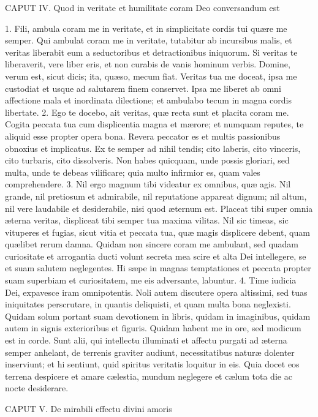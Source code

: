 CAPUT IV.
Quod in veritate et humilitate coram Deo conversandum est

1. Fili, ambula coram me in veritate, et in simplicitate cordis tui quære me semper. Qui ambulat coram me in veritate, tutabitur ab incursibus malis, et veritas liberabit eum a seductoribus et detractionibus iniquorum. Si veritas te liberaverit, vere liber eris, et non curabis de vanis hominum verbis.
Domine, verum est, sicut dicis; ita, quæso, mecum fiat. Veritas tua me doceat, ipsa me custodiat et usque ad salutarem finem conservet. Ipsa me liberet ab omni affectione mala et inordinata dilectione; et ambulabo tecum in magna cordis libertate.
2. Ego te docebo, ait veritas, quæ recta sunt et placita coram me. Cogita peccata tua cum displicentia magna et mærore; et numquam reputes, te aliquid esse propter opera bona. Revera peccator es et multis passionibus obnoxius et implicatus. Ex te semper ad nihil tendis; cito laberis, cito vinceris, cito turbaris, cito dissolveris. Non habes quicquam, unde possis gloriari, sed multa, unde te debeas vilificare; quia multo infirmior es, quam vales comprehendere.
3. Nil ergo magnum tibi videatur ex omnibus, quæ agis. Nil grande, nil pretiosum et admirabile, nil reputatione appareat dignum; nil altum, nil vere laudabile et desiderabile, nisi quod æternum est. Placeat tibi super omnia æterna veritas, displiceat tibi semper tua maxima vilitas. Nil sic timeas, sic vituperes et fugias, sicut vitia et peccata tua, quæ magis displicere debent, quam quælibet rerum damna. Quidam non sincere coram me ambulant, sed quadam curiositate et arrogantia ducti volunt secreta mea scire et alta Dei intellegere, se et suam salutem neglegentes. Hi sæpe in magnas temptationes et peccata propter suam superbiam et curiositatem, me eis adversante, labuntur.
4. Time iudicia Dei, expavesce iram omnipotentis. Noli autem discutere opera altissimi, sed tuas iniquitates perscrutare, in quantis deliquisti, et quam multa bona neglexisti. Quidam solum portant suam devotionem in libris, quidam in imaginibus, quidam autem in signis exterioribus et figuris. Quidam habent me in ore, sed modicum est in corde. Sunt alii, qui intellectu illuminati et affectu purgati ad æterna semper anhelant, de terrenis graviter audiunt, necessitatibus naturæ dolenter inserviunt; et hi sentiunt, quid spiritus veritatis loquitur in eis. Quia docet eos terrena despicere et amare cælestia, mundum neglegere et cælum tota die ac nocte desiderare.


CAPUT V.
De mirabili effectu divini amoris

